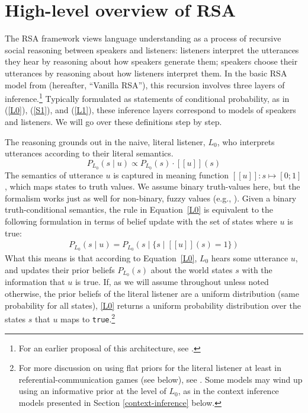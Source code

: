 \documentclass{sp}
\newcommand{\sem}[1]{\ensuremath{[\![#1]\!]}}
\begin{document}
\section{High-level overview of RSA} \label{overview}

The RSA framework views language understanding as a process of recursive social reasoning between speakers and listeners: listeners interpret the utterances they hear by reasoning about how speakers generate them; speakers choose their utterances by reasoning about how listeners interpret them. In the basic RSA model from \cite{frankgoodman2012} (hereafter, ``Vanilla RSA''), this recursion involves three layers of inference.\footnote{For an earlier proposal of this architecture, see \cite{BenzvanRooijOptimalAssertions2007}.} Typically formulated as statements of conditional probability, as in (\ref{L0}), (\ref{S1}), and (\ref{L1}), these inference layers correspond to models of speakers and listeners. We will go over these definitions step by step.

The reasoning grounds out in the naive, literal listener, $L_0$, who interprets utterances according to their literal semantics.
\begin{equation} \label{L0}
P_{L_0}(s \mid u) \propto P_{L_0}(s) \cdot \sem{u}(s)
\end{equation}
The semantics of utterance $u$ is captured in meaning function $\sem{u} \colon s \mapsto [0;1]$, which maps states to truth values.
We assume binary truth-values here, but the formalism works just as well for non-binary, fuzzy values (e.g., \citealp{degenetal2020}).
Given a binary truth-conditional semantics, the rule in Equation~\eqref{L0} is equivalent to the following formulation in terms of belief update with the set of states where $u$ is true:
\begin{align}
  \label{eq:1}
  P_{L_{0}}(s \mid u) = P_{L_{0}}(s \mid \{ s \mid \sem{u}(s) = 1\})
\end{align}
What this means is that according to Equation~\eqref{L0}, $L_0$ hears some utterance $u$, and updates their prior beliefs $P_{L_{0}}(s)$ about the world states $s$ with the information that $u$ is true.
If, as we will assume throughout unless noted otherwise, the prior beliefs of the literal listener are a uniform distribution (same probability for all states), \eqref{L0} returns a uniform probability distribution over the states $s$ that $u$ maps to \texttt{true}.\footnote{For more discussion on using flat priors for the literal listener at least in referential-communication games (see below), see \cite{qingfranke2015}. Some models may wind up using an informative prior at the level of $L_0$, as in the context inference models presented in Section \ref{context-inference} below.}
\end{document}
